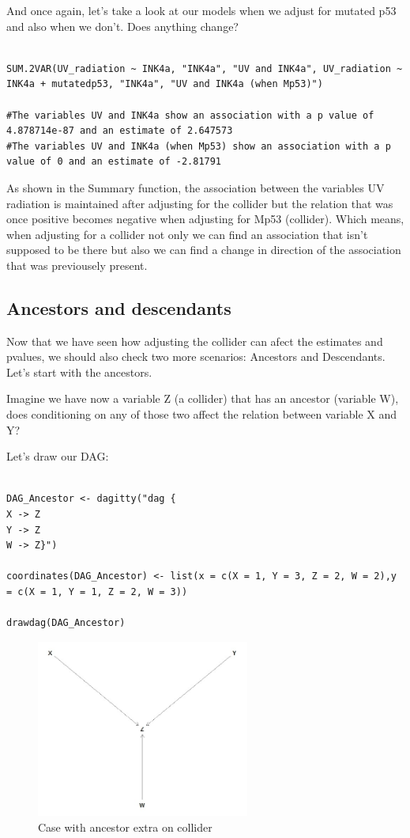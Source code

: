 \documentclass{article}
\begin{document}
And once again, let's take a look at our models when we adjust for mutated p53 and also when we don't. Does anything change?\par

\begin{lstlisting}

SUM.2VAR(UV_radiation ~ INK4a, "INK4a", "UV and INK4a", UV_radiation ~ INK4a + mutatedp53, "INK4a", "UV and INK4a (when Mp53)")

#The variables UV and INK4a show an association with a p value of 4.878714e-87 and an estimate of 2.647573 
#The variables UV and INK4a (when Mp53) show an association with a p value of 0 and an estimate of -2.81791 

\end{lstlisting}
As shown in the Summary function, the association between the variables UV  radiation is maintained after adjusting for the collider but the relation that was once positive becomes negative when adjusting for Mp53 (collider). Which means, when adjusting for a collider not only we can find an association that isn't supposed to be there but also we can find a change in direction of the association that was previousely present.\par

\subsection{Ancestors and descendants}
Now that we have seen how adjusting the collider can afect the estimates and pvalues, we should also check two more scenarios: Ancestors and Descendants. Let's start with the ancestors.\par
Imagine we have now a variable Z (a collider) that has an ancestor (variable W), does conditioning on any of those two affect the relation between variable X and Y?\par

Let's draw our DAG: 

\begin{lstlisting}

DAG_Ancestor <- dagitty("dag {
X -> Z
Y -> Z
W -> Z}")

coordinates(DAG_Ancestor) <- list(x = c(X = 1, Y = 3, Z = 2, W = 2),y = c(X = 1, Y = 1, Z = 2, W = 3))

drawdag(DAG_Ancestor)
\end{lstlisting}

\begin{figure}[h]
\caption{Case with ancestor extra on collider}
\includegraphics[width=7cm]{DAG_ANCESTOR.png}
\centering
\end{figure}
\end{document}
